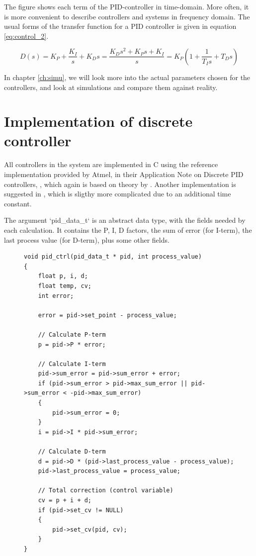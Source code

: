 The figure shows each term of the PID-controller in time-domain. More often, it is more convenient to describe controllers and systems in frequency domain. The usual forms of the transfer function for a PID controller is given in equation \ref{eq:control_2}.

\begin{equation}\label{eq:control_2}
	D(s) = K_P + \frac{K_I}{s} + K_D s = \frac{K_Ds^2 + K_Ps + K_I}{s} = K_P(1 + \frac{1}{T_Is} + T_Ds)
\end{equation}

In chapter \ref{ch:simu}, we will look more into the actual parameters chosen for the controllers, and look at simulations and compare them against reality. 


%
%
%
%
\section{Implementation of discrete controller}

All controllers in the system are implemented in C using the reference implementation provided by Atmel, in their Application Note on Discrete PID controllers, \citep{avr221}, which again is based on theory by \citep{aastrom1995}. Another implementation is suggested in \citep{friesel_note9}, which is sligthy more complicated due to an additional time constant.

The argument `pid\_data\_t` is an abstract data type, with the fields needed by each calculation. It contains the P, I, D factors, the sum of error (for I-term), the last process value (for D-term), plus some other fields. 

\lstset{language=C,basicstyle=\tiny,numbers=left}
\begin{figure}
\begin{lstlisting}[frame=single,caption=Implementation of discrete PID controller,label=lst:control_1]
void pid_ctrl(pid_data_t * pid, int process_value)
{
	float p, i, d;
	float temp, cv;
	int error;

	error = pid->set_point - process_value;
	
	// Calculate P-term
	p = pid->P * error;

	// Calculate I-term
	pid->sum_error = pid->sum_error + error;
	if (pid->sum_error > pid->max_sum_error || pid->sum_error < -pid->max_sum_error)
	{
		pid->sum_error = 0;
	}
	i = pid->I * pid->sum_error;

	// Calculate D-term
	d = pid->D * (pid->last_process_value - process_value);
	pid->last_process_value = process_value;

	// Total correction (control variable)
	cv = p + i + d;
	if (pid->set_cv != NULL)
	{
		pid->set_cv(pid, cv);
	}
}
\end{lstlisting}
\end{figure}

